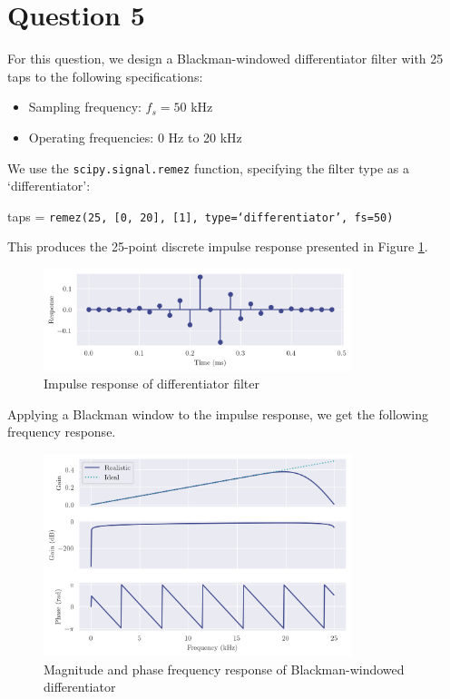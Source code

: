 \section*{Question 5}

For this question, we design a Blackman-windowed differentiator filter with 25 taps to the following specifications:
\begin{multicols}{2}
    \begin{itemize}
        \item Sampling frequency: $f_s=50$ kHz
        \item Operating frequencies: 0 Hz to 20 kHz
    \end{itemize}
\end{multicols}
We use the \texttt{scipy.signal.remez} function, specifying the filter type as a `differentiator':
\begin{center}
    taps = \texttt{remez(25, [0, 20], [1], type=`differentiator', fs=50)}
\end{center}
This produces the 25-point discrete impulse response presented in Figure \ref{fig:q5_diff_impz}.

\begin{figure}[ht]
    \centering
    \includegraphics[width=0.8\textwidth]{images/q5_diff_impz.png}
    \caption{Impulse response of differentiator filter}
    \label{fig:q5_diff_impz}
\end{figure}

Applying a Blackman window to the impulse response, we get the following frequency response.

\begin{figure}[ht]
    \centering
    \includegraphics[width=0.8\textwidth]{images/q5_diff_freqz.png}
    \caption{Magnitude and phase frequency response of Blackman-windowed differentiator}
    \label{fig:q5_diff_freqz}
\end{figure}

